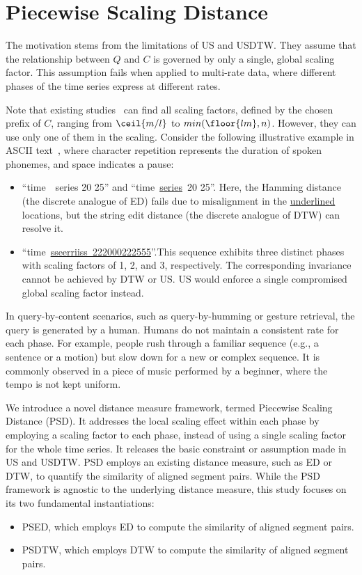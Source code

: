 \section{Piecewise Scaling Distance} \label{sec:methods}

The motivation stems from the limitations of US and USDTW.
They assume that the relationship between $Q$ and $C$ is governed by only a single, global scaling factor. 
This assumption fails when applied to multi-rate data, where different phases of the time series express at different rates.

Note that existing studies~\cite{keogh2004indexing, rakthanmanon2013addressing} can find all scaling factors, defined by the chosen prefix of $C$, ranging from $\ceil{m/l}$ to $min(\floor{lm}, n)$. 
However, they can use only one of them in the scaling.
Consider the following illustrative example in ASCII text~\cite{rakthanmanon2013addressing}, where character repetition represents the duration of spoken phonemes, and space indicates a pause:
\begin{itemize}
    \item ``time~\quad~series 20 25'' and ``time~\underline{series\quad}~20 25''. Here, the Hamming distance (the discrete analogue of ED) fails due to misalignment in the \underline{underlined} locations, but the string edit distance (the discrete analogue of DTW) can resolve it.
    \item ``time~\underline{sseerriiss~222000222555}''.This sequence exhibits three distinct phases with scaling factors of 1, 2, and 3, respectively. 
    The corresponding invariance cannot be achieved by DTW or US.
    US would enforce a single compromised global scaling factor instead.
\end{itemize}

In query-by-content scenarios, such as query-by-humming or gesture retrieval, the query is generated by a human.
Humans do not maintain a consistent rate for each phase.
For example, people rush through a familiar sequence (e.g., a sentence or a motion) but slow down for a new or complex sequence. It is commonly observed in a piece of music performed by a beginner, where the tempo is not kept uniform.

We introduce a novel distance measure framework, termed Piecewise Scaling Distance (PSD). 
It addresses the local scaling effect within each phase by employing a scaling factor to each phase, instead of using a single scaling factor for the whole time series.
It releases the basic constraint or assumption made in US and USDTW.
%
PSD employs an existing distance measure, such as ED or DTW, to quantify the similarity of aligned segment pairs.
While the PSD framework is agnostic to the underlying distance measure, this study focuses on its two fundamental instantiations:
\begin{itemize}
    \item PSED, which employs ED to compute the similarity of aligned segment pairs.
    \item PSDTW, which employs DTW to compute the similarity of aligned segment pairs.
\end{itemize}

